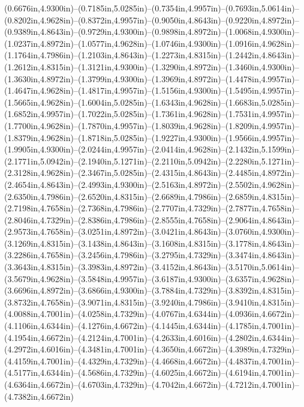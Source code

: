 (0.6676in,4.9300in)--(0.7185in,5.0285in)--(0.7354in,4.9957in)--(0.7693in,5.0614in)--(0.8202in,4.9628in)--(0.8372in,4.9957in)--(0.9050in,4.8643in)--(0.9220in,4.8972in)--(0.9389in,4.8643in)--(0.9729in,4.9300in)--(0.9898in,4.8972in)--(1.0068in,4.9300in)--(1.0237in,4.8972in)--(1.0577in,4.9628in)--(1.0746in,4.9300in)--(1.0916in,4.9628in)--(1.1764in,4.7986in)--(1.2103in,4.8643in)--(1.2273in,4.8315in)--(1.2442in,4.8643in)--(1.2612in,4.8315in)--(1.3121in,4.9300in)--(1.3290in,4.8972in)--(1.3460in,4.9300in)--(1.3630in,4.8972in)--(1.3799in,4.9300in)--(1.3969in,4.8972in)--(1.4478in,4.9957in)--(1.4647in,4.9628in)--(1.4817in,4.9957in)--(1.5156in,4.9300in)--(1.5495in,4.9957in)--(1.5665in,4.9628in)--(1.6004in,5.0285in)--(1.6343in,4.9628in)--(1.6683in,5.0285in)--(1.6852in,4.9957in)--(1.7022in,5.0285in)--(1.7361in,4.9628in)--(1.7531in,4.9957in)--(1.7700in,4.9628in)--(1.7870in,4.9957in)--(1.8039in,4.9628in)--(1.8209in,4.9957in)--(1.8379in,4.9628in)--(1.8718in,5.0285in)--(1.9227in,4.9300in)--(1.9566in,4.9957in)--(1.9905in,4.9300in)--(2.0244in,4.9957in)--(2.0414in,4.9628in)--(2.1432in,5.1599in)--(2.1771in,5.0942in)--(2.1940in,5.1271in)--(2.2110in,5.0942in)--(2.2280in,5.1271in)--(2.3128in,4.9628in)--(2.3467in,5.0285in)--(2.4315in,4.8643in)--(2.4485in,4.8972in)--(2.4654in,4.8643in)--(2.4993in,4.9300in)--(2.5163in,4.8972in)--(2.5502in,4.9628in)--(2.6350in,4.7986in)--(2.6520in,4.8315in)--(2.6689in,4.7986in)--(2.6859in,4.8315in)--(2.7198in,4.7658in)--(2.7368in,4.7986in)--(2.7707in,4.7329in)--(2.7877in,4.7658in)--(2.8046in,4.7329in)--(2.8386in,4.7986in)--(2.8555in,4.7658in)--(2.9064in,4.8643in)--(2.9573in,4.7658in)--(3.0251in,4.8972in)--(3.0421in,4.8643in)--(3.0760in,4.9300in)--(3.1269in,4.8315in)--(3.1438in,4.8643in)--(3.1608in,4.8315in)--(3.1778in,4.8643in)--(3.2286in,4.7658in)--(3.2456in,4.7986in)--(3.2795in,4.7329in)--(3.3474in,4.8643in)--(3.3643in,4.8315in)--(3.3983in,4.8972in)--(3.4152in,4.8643in)--(3.5170in,5.0614in)--(3.5679in,4.9628in)--(3.5848in,4.9957in)--(3.6187in,4.9300in)--(3.6357in,4.9628in)--(3.6696in,4.8972in)--(3.6866in,4.9300in)--(3.7884in,4.7329in)--(3.8392in,4.8315in)--(3.8732in,4.7658in)--(3.9071in,4.8315in)--(3.9240in,4.7986in)--(3.9410in,4.8315in)--(4.0088in,4.7001in)--(4.0258in,4.7329in)--(4.0767in,4.6344in)--(4.0936in,4.6672in)--(4.1106in,4.6344in)--(4.1276in,4.6672in)--(4.1445in,4.6344in)--(4.1785in,4.7001in)--(4.1954in,4.6672in)--(4.2124in,4.7001in)--(4.2633in,4.6016in)--(4.2802in,4.6344in)--(4.2972in,4.6016in)--(4.3481in,4.7001in)--(4.3650in,4.6672in)--(4.3989in,4.7329in)--(4.4159in,4.7001in)--(4.4329in,4.7329in)--(4.4668in,4.6672in)--(4.4837in,4.7001in)--(4.5177in,4.6344in)--(4.5686in,4.7329in)--(4.6025in,4.6672in)--(4.6194in,4.7001in)--(4.6364in,4.6672in)--(4.6703in,4.7329in)--(4.7042in,4.6672in)--(4.7212in,4.7001in)--(4.7382in,4.6672in) 
